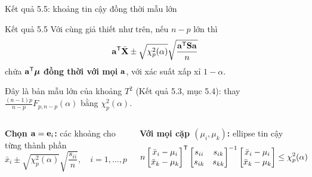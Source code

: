\begin{frame}{Kết quả 5.5: khoảng tin cậy đồng thời mẫu lớn}
  \setlength{\abovedisplayskip}{3pt}\setlength{\belowdisplayskip}{3pt}
  \begin{block}{Kết quả 5.5}
    Với cùng giả thiết như trên, nếu \(n-p\) lớn thì
    \[
      \mathbf{a}^{\mathsf T}\bar{\mathbf{X}} \pm \sqrt{\chi^2_p(\alpha)}\sqrt{\frac{\mathbf{a}^{\mathsf T}\mathbf{S}\mathbf{a}}{n}}
    \]
    chứa \(\mathbf{a}^{\mathsf T}\boldsymbol{\mu}\) \textbf{đồng thời với mọi} \(\mathbf{a}\), với xác suất xấp xỉ \(1-\alpha\).
  \end{block}
  {\small\color{hustgray} Đây là bản mẫu lớn của khoảng \(T^2\) (Kết quả 5.3, mục 5.4):
  thay \(\frac{(n-1)p}{n-p}F_{p,n-p}(\alpha)\) bằng \(\chi^2_p(\alpha)\).\par}
  \vspace{0.1cm}
  \begin{columns}[T,onlytextwidth]
    \begin{exampleblock}{}\small
      \textbf{Chọn \(\mathbf{a}=\mathbf{e}_i\):} các khoảng cho từng thành phần
      \[
        \bar{x}_i \pm \sqrt{\chi^2_p(\alpha)}\sqrt{\frac{s_{ii}}{n}},
        \quad i=1,\dots,p
      \]
    \end{exampleblock}
    \begin{exampleblock}{}\small
      \textbf{Với mọi cặp \((\mu_i,\mu_k)\):} ellipse tin cậy
      \[
        n\begin{bmatrix}\bar{x}_i-\mu_i\\ \bar{x}_k-\mu_k\end{bmatrix}^{\mathsf T}
        \begin{bmatrix} s_{ii} & s_{ik}\\ s_{ik} & s_{kk}\end{bmatrix}^{-1}
        \begin{bmatrix}\bar{x}_i-\mu_i\\ \bar{x}_k-\mu_k\end{bmatrix}
        \le \chi^2_p(\alpha)
      \]
    \end{exampleblock}
  \end{columns}
\end{frame}

